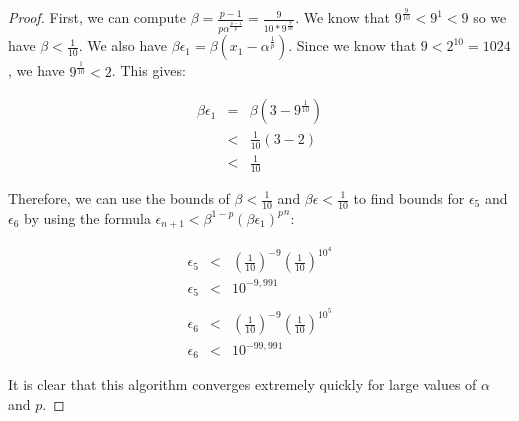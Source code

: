 \documentclass[psamsfonts]{amsart}
\theoremstyle{definition}
\theoremstyle{remark}
\numberwithin{equation}{section}
\begin{document}
\begin{proof}
First, we can compute $\beta =\frac{p-1}{p \alpha^{\frac{p-1}{p}}} = \frac{9}{10 * 9^{\frac{9}{10}}}$. We know that $9^{\frac{9}{10}} < 9^1 < 9$ so we have $\beta < \frac{1}{10}$. We also have $\beta \epsilon_1 = \beta ( x_1 - \alpha^{\frac{1}{p}} )$. Since we know that $9 < 2^{10} = 1024 $, we have $9^{\frac{1}{10}} < 2$. This gives:

\begin{eqnarray}
\beta \epsilon_1 &=& \beta ( 3 - 9^{\frac{1}{10}} ) \\
&<& \frac{1}{10} (3 - 2) \\
&<& \frac{1}{10}
\end{eqnarray}

Therefore, we can use the bounds of $\beta < \frac{1}{10}$ and $\beta \epsilon < \frac{1}{10}$ to find bounds for $\epsilon_5$ and $\epsilon_6$ by using the formula $\epsilon_{n+1} < \beta^{1-p} {(\beta \epsilon_1)^p}^n$:

\begin{eqnarray}
\epsilon_5 &<& \left( \frac{1}{10} \right)^{-9} \left( \frac{1}{10} \right)^{10^4} \\
\epsilon_5 &<& 10^{-9,991} \\
\nonumber \\
\epsilon_6 &<& \left( \frac{1}{10} \right)^{-9} \left( \frac{1}{10} \right)^{10^5} \\
\epsilon_6 &<& 10^{-99,991}
\end{eqnarray}

It is clear that this algorithm converges extremely quickly for large values of $\alpha$ and $p$. 
\end{proof}
\end{document}
